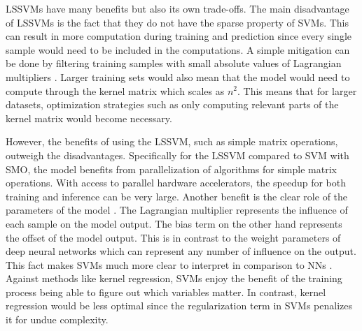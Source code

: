 LSSVMs have many benefits but also its own trade-offs. The main disadvantage of LSSVMs is the fact that they do not have the sparse property of SVMs. This can result in more computation during training and prediction since every single sample would need to be included in the computations. A simple mitigation can be done by filtering training samples with small absolute values of Lagrangian multipliers \autocite{haifengwangComparisonSVMLSSVM2005}. Larger training sets would also mean that the model would need to compute through the kernel matrix which scales as \(n^2\). This means that for larger datasets, optimization strategies such as only computing relevant parts of the kernel matrix would become necessary.

However, the benefits of using the LSSVM, such as simple matrix operations, outweigh the disadvantages. Specifically for the LSSVM compared to SVM with SMO, the model benefits from parallelization of algorithms for simple matrix operations. With access to parallel hardware accelerators, the speedup for both training and inference can be very large. Another benefit is the clear role of the parameters of the model \autocite{suykensLeastSquaresSupport2005}. The Lagrangian multiplier represents the influence of each sample on the model output. The bias term on the other hand represents the offset of the model output. This is in contrast to the weight parameters of deep neural networks which can represent any number of influence on the output. This fact makes SVMs much more clear to interpret in comparison to NNs \autocite{zhouInterpretingDeepVisual2019}. Against methods like kernel regression, SVMs enjoy the benefit of the training process being able to figure out which variables matter. In contrast, kernel regression would be less optimal since the regularization term in SVMs penalizes it for undue complexity.

